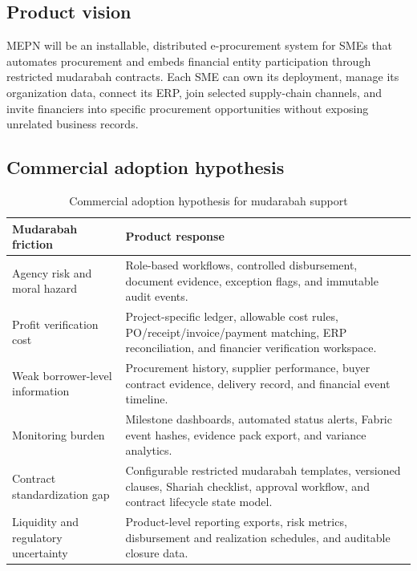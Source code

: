 \documentclass[11pt,a4paper]{article}
\newcommand{\systemshort}{MEPN}
\begin{document}
\subsection{Product vision}
\systemshort{} will be an installable, distributed e-procurement system for SMEs that automates procurement and embeds financial entity participation through restricted mudarabah contracts. Each SME can own its deployment, manage its organization data, connect its ERP, join selected supply-chain channels, and invite financiers into specific procurement opportunities without exposing unrelated business records.

\subsection{Commercial adoption hypothesis}
\begin{table}[h]
\centering
\begin{tabularx}{\textwidth}{@{}p{}X@{}}
\toprule
Mudarabah friction & Product response \\
\midrule
Agency risk and moral hazard & Role-based workflows, controlled disbursement, document evidence, exception flags, and immutable audit events. \\
Profit verification cost & Project-specific ledger, allowable cost rules, PO/receipt/invoice/payment matching, ERP reconciliation, and financier verification workspace. \\
Weak borrower-level information & Procurement history, supplier performance, buyer contract evidence, delivery record, and financial event timeline. \\
Monitoring burden & Milestone dashboards, automated status alerts, Fabric event hashes, evidence pack export, and variance analytics. \\
Contract standardization gap & Configurable restricted mudarabah templates, versioned clauses, Shariah checklist, approval workflow, and contract lifecycle state model. \\
Liquidity and regulatory uncertainty & Product-level reporting exports, risk metrics, disbursement and realization schedules, and auditable closure data. \\
\bottomrule
\end{tabularx}
\caption{Commercial adoption hypothesis for mudarabah support}
\end{table}
\end{document}
